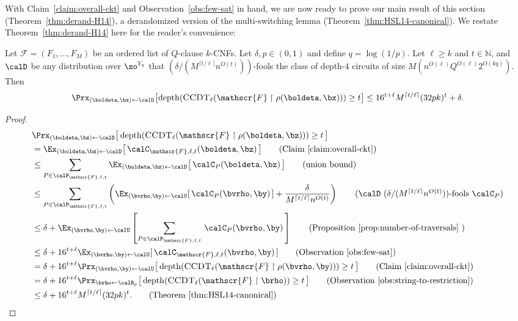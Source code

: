 \documentclass{toc}
\theoremstyle{plain}
\newcommand{\uhr}{\upharpoonright}
\newcommand{\CCDT}{\textsc{CCDT}}
\newcommand{\depth}{\mathrm{depth}}
\renewcommand{\N}{\mathds{N}}
\begin{document}
With Claim~\ref{claim:overall-ckt} and Observation~\ref{obs:few-sat} in hand, we are now ready to prove our main result of this section (Theorem~\ref{thm:derand-H14}), a derandomized version of the multi-switching lemma (Theorem~\ref{thm:HSL14-canonical}). We restate Theorem~\ref{thm:derand-H14} here for the reader's convenience: 


\begin{theorem} 
Let $\mathscr{F} = (F_1,\ldots,F_M)$ be an ordered list of $Q$-clause $k$-CNFs. Let $\delta,p \in (0,1)$ and define $q = \log(1/p)$. Let $\ell \geq k$ and $t\in \N$, and  $\calD$ be any distribution over $\zo^{Y_q}$ that $(\delta/(M^{\lceil t/\ell\rceil} n^{O(t)}))$-fools the class of depth-$4$ circuits of size $M(n^{O(\ell)}Q^{O(\ell)} 2^{O(kq)})$.  Then
 \[ \Prx_{(\boldeta,\bz)\leftarrow\calD}\big[ \depth(\CCDT_{\ell}(\mathscr{F}\uhr\rho(\boldeta,\bz))) \ge t\big] \le 16^{t+\ell}M^{\lceil t/\ell\rceil} (32pk)^t + \delta. \]
\end{theorem}

\begin{proof} 
\begin{align*}
&\Prx_{(\boldeta,\bz)\leftarrow\calD}\big[\,\depth(\CCDT_\ell(\mathscr{F}\uhr\rho(\boldeta,\bz))) \ge t\,\big] \\ 
&= \Ex_{(\boldeta,\bz)\leftarrow\calD}\big[\,\calC_{\mathscr{F},\ell,t}(\boldeta,\bz)\,\big] \tag*{(Claim~\ref{claim:overall-ckt})}\\
&\le \sum_{P \in \calP_{\mathscr{F},\ell,t}}\Ex_{(\boldeta,\bz)\leftarrow\calD}\big[\,\calC_P(\boldeta,\bz)\,\big]  \tag*{(union bound)} \\
&\le \sum_{P \in \calP_{\mathscr{F},\ell,t}}\left(\Ex_{(\bvrho,\by)\leftarrow\calU}[\,\calC_P(\bvrho,\by) \,] + \frac{\delta}{M^{\lceil t/\ell\rceil} n^{O(t)}}\right) \tag*{($\calD$ $(\delta/(M^{\lceil t/\ell\rceil} n^{O(t)}))$-fools $\calC_P$)} \\
&\le \delta + \Ex_{(\bvrho,\by)\leftarrow\calU}\left[\sum_{P \in \calP_{\mathscr{F},\ell,t}}\,\calC_P(\bvrho,\by) \,\right] \tag*{(Proposition~\ref{prop:number-of-traversals} 
)} \\
&\le \delta + 16^{t+\ell} \Ex_{(\bvrho,\by)\leftarrow\calU}[\,\calC_{\mathscr{F},\ell,t}(\bvrho,\by)\,] \tag*{(Observation~\ref{obs:few-sat})} \\
&= \delta + 16^{t+\ell} \Prx_{(\bvrho,\by)\leftarrow\calU}\big[\,\depth(\CCDT_\ell(\mathscr{F}\uhr\rho(\bvrho,\by))) \ge t\,\big] \tag*{(Claim~\ref{claim:overall-ckt})}\\
&= \delta + 16^{t+\ell} \Prx_{\brho\leftarrow\calR_p}\big[\,\depth(\CCDT_\ell(\mathscr{F}\uhr \brho)) \ge t\,\big] \tag*{(Observation~\ref{obs:string-to-restriction})}  \\ 
&\le \delta + 16^{t+\ell} M^{\lceil t/\ell\rceil} (32pk)^t. \tag*{(Theorem~\ref{thm:HSL14-canonical})} 
\end{align*} 
\end{proof} 
\end{document}
